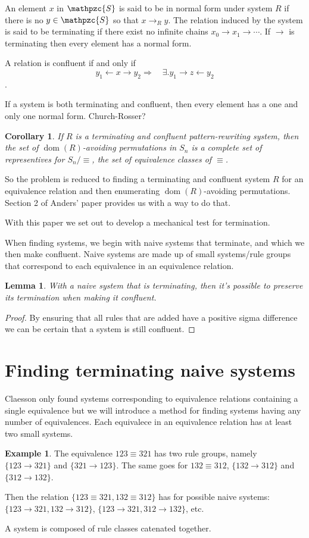 \documentclass[a4paper, 11pt]{article}
\newtheorem{lemma}[theorem]{Lemma}
\newtheorem{corollary}[theorem]{Corollary}
\theoremstyle{definition}
\newtheorem{example}[theorem]{Example}
\newcommand{\Sym}{\mathpzc{S}}
\DeclareMathOperator{\dom}{dom}
\begin{document}
An element $x$ in $\Sym$ is said to be in normal form under system $R$ if there
is no $y \in \Sym$ so that $x \to_R y$. The relation induced by the system is
said to be terminating if there exist no infinite chains $x_0 \to x_1 \to
\cdots$. If $\to$ is terminating then every element has a normal form. 

A relation is confluent if and only if
$$
    y_1 \leftarrow x \to y_2 \Longrightarrow \quad 
    \exists. y_1 \to z \leftarrow y_2
$$.

If a system is both terminating and confluent, then every element has a one and
only one normal form. Church-Rosser?

\begin{corollary}
    If $R$ is a terminating and confluent pattern-rewriting system, then the set
    of $\dom(R)$-avoiding permutations in $S_n$ is a complete set of
    representives for $S_n / \equiv$, the set of equivalence classes of
    $\equiv$.
\end{corollary}

So the problem is reduced to finding a terminating and confluent system $R$ for
an equivalence relation and then enumerating $\dom(R)$-avoiding permutations.
Section 2 of Anders' paper provides us with a way to do that. \cite{claesson}

With this paper we set out to develop a mechanical test for termination.

When finding systems, we begin with naive systems that terminate, and which we
then make confluent. Naive systems are made up of small systems/rule groups that
correspond to each equivalence in an equivalence relation.

\begin{lemma}
    With a naive system that is terminating, then it's possible to preserve its
    termination when making it confluent.
\end{lemma}
\begin{proof}
    By ensuring that all rules that are added have a positive sigma difference
    we can be certain that a system is still confluent. 
\end{proof}

\section{Finding terminating naive systems}
Claesson only found systems corresponding to equivalence relations containing a single equivalence but we will
introduce a method for finding systems having any number of equivalences.
Each equivalece in an equivalence relation has at least two small systems.
\begin{example}
    The equivalence $123 \equiv 321$ has two rule groups, namely $\{123 \to
    321\}$ and $\{321 \to 123\}$. The same goes for $132 \equiv 312$, $\{132 \to
    312\}$ and $\{312 \to 132\}$.

    Then the relation $\{123 \equiv 321, 132 \equiv 312\}$ has for possible
    naive systems: $\{123 \to 321, 132 \to 312\}$, $\{123 \to 321, 312 \to
    132\}$, etc.
\end{example}
A system is composed of rule classes catenated together.
\end{document}
